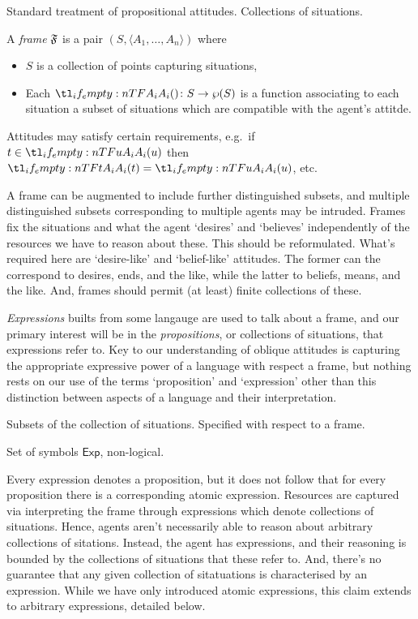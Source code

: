 \documentclass[10pt]{article}
\begin{document}
Standard treatment of propositional attitudes.
Collections of situations.

\begin{definition}[Frame]
  A \emph{frame} \(\mathfrak{F}\) is a pair \((S,\langle A_{1},\dots,A_{n} \rangle)\) where
  \begin{itemize}
  \item \(S\) is a collection of points capturing situations,
  \item Each \(\fatt{} \colon S \to \wp(S)\) is a function associating to each situation a subset of situations which are compatible with the agent's attitde.
  \end{itemize}
  Attitudes may satisfy certain requirements, e.g.\ if \(t \in \fatt{u}\) then \(\fatt{t} = \fatt{u}\), etc.
\end{definition}
A frame can be augmented to include further distinguished subsets, and multiple distinguished subsets corresponding to multiple agents may be intruded.
Frames fix the situations and what the agent `desires' and `believes' independently of the resources we have to reason about these.
{\color{red} This should be reformulated.
  What's required here are `desire-like' and `belief-like' attitudes.
  The former can the correspond to desires, ends, and the like, while the latter to beliefs, means, and the like.
  And, frames should permit (at least) finite collections of these.}

\emph{Expressions} builts from some langauge are used to talk about a frame, and our primary interest will be in the \emph{propositions}, or collections of situations, that expressions refer to.
Key to our understanding of oblique attitudes is capturing the appropriate expressive power of a language with respect a frame, but nothing rests on our use of the terms `proposition' and `expression' other than this distinction between aspects of a language and their interpretation.

\begin{definition}[Propositions]
  Subsets of the collection of situations.
  Specified with respect to a frame.
\end{definition}

\begin{definition}
  Set of symbols \(\mathsf{Exp}\), non-logical.
\end{definition}

Every expression denotes a proposition, but it does not follow that for every proposition there is a corresponding atomic expression.
Resources are captured via interpreting the frame through expressions which denote collections of situations.
Hence, agents aren't necessarily able to reason about arbitrary collections of sitations.
Instead, the agent has expressions, and their reasoning is bounded by the collections of situations that these refer to.
And, there's no guarantee that any given collection of sitatuations is characterised by an expression.
While we have only introduced atomic expressions, this claim extends to arbitrary expressions, detailed below.
\end{document}
